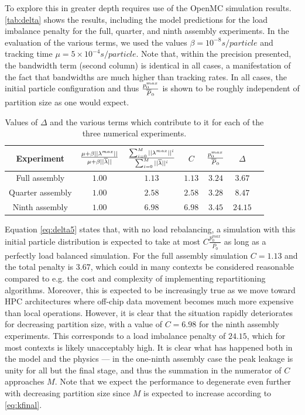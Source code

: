 To explore this in greater depth requires use of the OpenMC simulation
results. \autoref{tab:delta} shows the results, including the model predictions
for the load imbalance penalty for the full, quarter, and ninth assembly
experiments. In the evaluation of the various terms, we used the values $\beta =
10^{-8} \unit{s/particle}$ and tracking time $\mu = 5\times10^{-4}
\unit{s/particle}$. Note that, within the precision presented, the bandwidth
term (second column) is identical in all cases, a manifestation of the fact that
bandwidths are much higher than tracking rates. In all cases, the initial
particle configuration and thus $\frac{p_0^{max}}{\overline{P}_0}$ is shown to be
roughly independent of partition size as one would expect.
\begin{table}
  \centering
  \begin{tabular}{c c c c c c c}
    \toprule
    Experiment & $\frac{\mu + \beta ||\lambda^{max}||}{\mu + \beta ||\overline{\lambda}||}$ &
    $\frac{\sum_{i=0}^M ||{\lambda^{max}}||^i}{\sum_{i=0}^M ||\overline{\lambda}||^i}$ & $C$
    & $\frac{p_0^{max}}{\overline{P}_0}$ & $\Delta$ \\
    \midrule
    Full assembly & $1.00$ & $1.13$ & $1.13$ & $3.24$ & $3.67$\\
    Quarter assembly & $1.00$ & $2.58$ & $2.58$ & $3.28$ & $8.47$\\
    Ninth assembly & $1.00$ & $6.98$ & $6.98$ & $3.45$ & $24.15$\\
    \bottomrule
  \end{tabular}
  \caption{Values of $\Delta$ and the various terms which contribute to it for
    each of the three numerical experiments.}
  \label{tab:delta}
\end{table}

Equation \eqref{eq:delta5} states that, with no load rebalancing, a simulation
with this initial particle distribution is expected to take at most
$C\frac{p_0^{max}}{\overline{P_0}}$ as long as a perfectly load balanced
simulation. For the full assembly simulation $C=1.13$ and the total penalty is
$3.67$, which could in many contexts be considered reasonable compared to
e.g. the cost and complexity of implementing repartitioning
algorithms. Moreover, this is expected to be increasingly true as we move toward
HPC architectures where off-chip data movement becomes much more expensive than
local operations. However, it is clear that the situation rapidly deteriorates
for decreasing partition size, with a value of $C=6.98$ for the ninth assembly
experiments. This corresponds to a load imbalance penalty of $24.15$, which for
most contexts is likely unacceptably high. It is clear what has happened both in
the model and the physics --- in the one-ninth assembly case the peak leakage is
unity for all but the final stage, and thus the summation in the numerator of
$C$ approaches $M$. Note that we expect the performance to degenerate even
further with decreasing partition size since $M$ is expected to increase
according to \eqref{eq:kfinal}.

